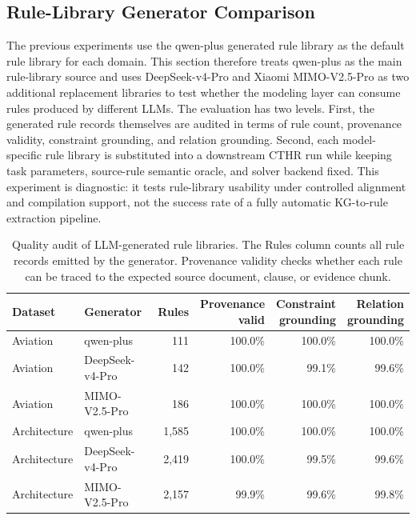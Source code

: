 ﻿\documentclass[a4paper,fleqn]{cas-dc}
\newcommand{\CTHR}{\textsc{CTHR}}
\begin{document}
\subsection{Rule-Library Generator Comparison}
\label{sec:rule_library_exp}

The previous experiments use the qwen-plus generated rule library as the
default rule library for each domain. This section therefore treats qwen-plus as
the main rule-library source and uses DeepSeek-v4-Pro and Xiaomi MIMO-V2.5-Pro as two
additional replacement libraries to test whether the modeling layer can consume
rules produced by different LLMs. The evaluation has two levels. First, the
generated rule records themselves are audited in terms of rule count,
provenance validity, constraint grounding, and relation grounding. Second, each
model-specific rule library is substituted into a downstream \CTHR{} run while keeping task
parameters, source-rule semantic oracle, and solver backend fixed. This
experiment is diagnostic: it tests rule-library usability under controlled
alignment and compilation support, not the success rate of a fully automatic
KG-to-rule extraction pipeline.

\begin{table}[t]
\centering
\caption{Quality audit of LLM-generated rule libraries. The Rules column counts
all rule records emitted by the generator. Provenance validity checks whether
each rule can be traced to the expected source document, clause, or evidence
chunk.}
\label{tab:rule_library_quality}
\footnotesize
\begin{tabular*}{\textwidth}{@{}l@{\extracolsep{\fill}}lrrrr@{}}
\toprule
Dataset & Generator & Rules & \shortstack{Provenance\\valid} & \shortstack{Constraint\\grounding} & \shortstack{Relation\\grounding} \\
\midrule
Aviation & qwen-plus & 111 & 100.0\% & 100.0\% & 100.0\% \\
Aviation & DeepSeek-v4-Pro & 142 & 100.0\% & 99.1\% & 99.6\% \\
Aviation & MIMO-V2.5-Pro & 186 & 100.0\% & 100.0\% & 100.0\% \\
\midrule
Architecture & qwen-plus & 1,585 & 100.0\% & 100.0\% & 100.0\% \\
Architecture & DeepSeek-v4-Pro & 2,419 & 100.0\% & 99.5\% & 99.6\% \\
Architecture & MIMO-V2.5-Pro & 2,157 & 99.9\% & 99.6\% & 99.8\% \\
\bottomrule
\end{tabular*}
\end{table}
\end{document}
